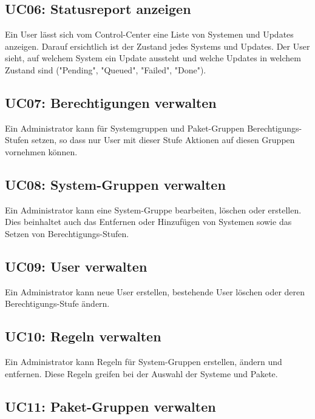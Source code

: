\subsection{UC06: Statusreport anzeigen}

Ein User lässt sich vom Control-Center eine Liste von Systemen und Updates anzeigen. Darauf ersichtlich ist der Zustand jedes Systems und Updates. Der User sieht, auf welchem System ein Update aussteht und welche Updates in welchem Zustand sind ("Pending", "Queued", "Failed", "Done").


\subsection{UC07: Berechtigungen verwalten}

Ein Administrator kann für Systemgruppen und Paket-Gruppen Berechtigungs-Stufen setzen, so dass nur User mit dieser Stufe Aktionen auf diesen Gruppen vornehmen können.

\subsection{UC08: System-Gruppen verwalten}

Ein Administrator kann eine System-Gruppe bearbeiten, löschen oder erstellen. Dies beinhaltet auch das Entfernen oder Hinzufügen von Systemen sowie das Setzen von Berechtigungs-Stufen.

\subsection{UC09: User verwalten}

Ein Administrator kann neue User erstellen, bestehende User löschen oder deren Berechtigungs-Stufe ändern.

\subsection{UC10: Regeln verwalten}

Ein Administrator kann Regeln für System-Gruppen erstellen, ändern und entfernen. Diese Regeln greifen bei der Auswahl der Systeme und Pakete.

\subsection{UC11: Paket-Gruppen verwalten}

